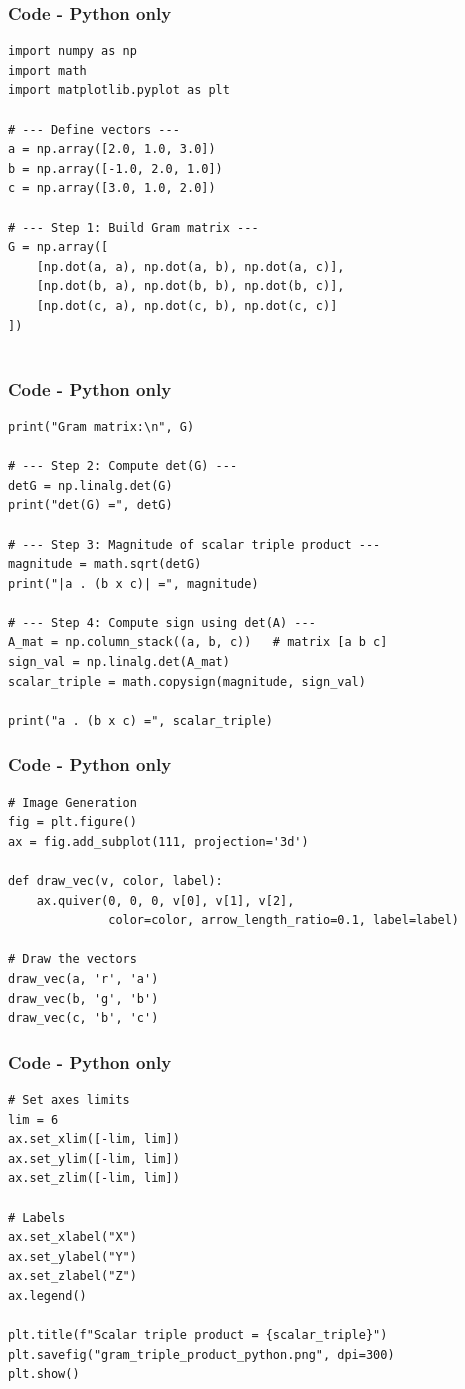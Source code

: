 \documentclass{beamer}
\theoremstyle{remark}
\numberwithin{equation}{section}
\begin{document}
\begin{frame}[fragile]
\frametitle{Code - Python only}
\begin{lstlisting}
import numpy as np
import math
import matplotlib.pyplot as plt

# --- Define vectors ---
a = np.array([2.0, 1.0, 3.0])
b = np.array([-1.0, 2.0, 1.0])
c = np.array([3.0, 1.0, 2.0])

# --- Step 1: Build Gram matrix ---
G = np.array([
    [np.dot(a, a), np.dot(a, b), np.dot(a, c)],
    [np.dot(b, a), np.dot(b, b), np.dot(b, c)],
    [np.dot(c, a), np.dot(c, b), np.dot(c, c)]
])


\end{lstlisting}
\end{frame}
\begin{frame}[fragile]
\frametitle{Code - Python only}
\begin{lstlisting}
print("Gram matrix:\n", G)

# --- Step 2: Compute det(G) ---
detG = np.linalg.det(G)
print("det(G) =", detG)

# --- Step 3: Magnitude of scalar triple product ---
magnitude = math.sqrt(detG)
print("|a . (b x c)| =", magnitude)

# --- Step 4: Compute sign using det(A) ---
A_mat = np.column_stack((a, b, c))   # matrix [a b c]
sign_val = np.linalg.det(A_mat)
scalar_triple = math.copysign(magnitude, sign_val)

print("a . (b x c) =", scalar_triple)

\end{lstlisting}
\end{frame}

\begin{frame}[fragile]
\frametitle{Code - Python only}
\begin{lstlisting}
# Image Generation
fig = plt.figure()
ax = fig.add_subplot(111, projection='3d')

def draw_vec(v, color, label):
    ax.quiver(0, 0, 0, v[0], v[1], v[2],
              color=color, arrow_length_ratio=0.1, label=label)

# Draw the vectors
draw_vec(a, 'r', 'a')
draw_vec(b, 'g', 'b')
draw_vec(c, 'b', 'c')

\end{lstlisting}
\end{frame}

\begin{frame}[fragile]
\frametitle{Code - Python only}
\begin{lstlisting}
# Set axes limits
lim = 6
ax.set_xlim([-lim, lim])
ax.set_ylim([-lim, lim])
ax.set_zlim([-lim, lim])

# Labels
ax.set_xlabel("X")
ax.set_ylabel("Y")
ax.set_zlabel("Z")
ax.legend()

plt.title(f"Scalar triple product = {scalar_triple}")
plt.savefig("gram_triple_product_python.png", dpi=300)
plt.show()


\end{lstlisting}
\end{frame}
\end{document}
